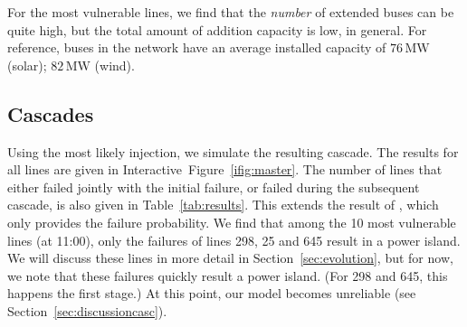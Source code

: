\documentclass[main.tex]{subfiles}
\begin{document}
For the most vulnerable lines, we find that the \emph{number} of extended buses can be quite high, but the total amount of addition capacity is low, in general. For reference, buses in the network have an average installed capacity of $76\,\si{\mega\watt}$ (solar); $82\,\si{\mega\watt}$ (wind). 
%
%

\subsection{Cascades}
Using the most likely injection, we simulate the resulting cascade. The results for all lines are given in Interactive~Figure~\ref{ifig:master}. The number of lines that either failed jointly with the initial failure, or failed during the subsequent cascade, is also given in Table~\ref{tab:results}. This extends the result of \cite{Nesti2018supplemental}, which only provides the failure probability. We find that among the 10 most vulnerable lines (at 11:00),
only the failures of lines 298, 25 and 645 result in a power island. We will discuss these lines in more detail in Section~\ref{sec:evolution}, but for now, we note that these failures quickly result a power island. (For 298 and 645, this happens the first stage.) At this point, our model becomes unreliable (see Section~\ref{sec:discussioncasc}).
\end{document}
